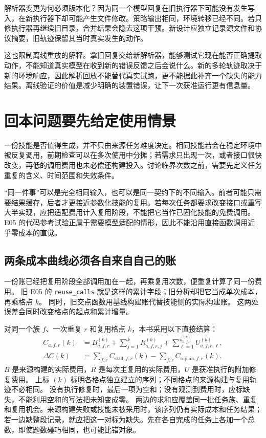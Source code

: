 解析器变更为何必须版本化？因为同一个模型回复在旧执行器下可能没有发生写入，在新执行器下却可能产生文件修改。策略输出相同，环境转移已经不同。若只修执行器再继续旧目录，合并结果会隐去这项干预。新设计应独立记录源文件和协议摘要，旧轨迹保留其当时真实发生的动作。

这也限制离线重放的解释。拿旧回复交给新解析器，能够测试它现在能否正确提取动作，不能知道真实模型在收到新的错误反馈之后会说什么。新的多轮轨迹取决于新的环境响应，因此解析回放不能替代真实试跑，更不能据此补齐一个缺失的能力结果。离线验证的价值是减少明确的装置错误，让下一次获准运行更有信息量。

\section{回本问题要先给定使用情景}
\label{sec:ch08-economics}

一份技能是否值得生成，并不只由来源任务难度决定。相同技能若会在稳定环境中被反复调用，前期检查可以在多次使用中分摊；若需求只出现一次，或者接口很快改变，再低的调用费用也未必偿还构建投入。讨论临界次数之前，需要先定义任务重复的含义、时间范围和失效条件。

“同一件事”可以是完全相同输入，也可以是同一契约下的不同输入。前者可能只需要结果缓存，后者才更接近参数化技能的复用。若每次任务都要求改变接口或重写大半实现，应把适配费用计入复用阶段，不能把它当作已固化技能的免费调用。E05 的代码参考试验正属于需要模型适配的情形，因此不能沿用直接函数调用近乎零成本的直觉。

\subsection{两条成本曲线必须各自来自自己的账}
\label{sec:ch08-ledger-reconcile}

一份账已经把复用阶段全部调用加在一起，再乘复用次数，便重复计算了同一份费用。
旧 E05 的 \texttt{reuse\_calls} 就是这样的累计字段；旧分析却把它当成单次成本，再乘格点 $k$。
同时，旧交点函数用基线构建账代替技能侧的实际构建账。
这两处误差会同时改变格点的起点和累计增量。

对同一个族 $f$、一次重复 $r$ 和复用格点 $k$，本书采用以下直接结算：
\begin{align}
 C_{a,f,r}(k)
 &= B_{a,f,r}^{(k)}+\sum_{j=1}^{k}R_{a,f,r,j}^{(k)}
    +\sum_{\ell=1}^{u_{a,f,r}^{(k)}}U_{a,f,r,\ell}^{(k)},
 \label{eq:ch08-observed-cost}\\
 \Delta C(k)
 &= \sum_{f,r}C_{\mathrm{skill},f,r}(k)
    -\sum_{f,r}C_{\mathrm{replan},f,r}(k).
\end{align}
$B$ 是来源构建的实际费用，$R$ 是每次主复用的实际费用，$U$ 是获准执行的附加修复费用。
上标 $(k)$ 标明各格点独立建立的序列；不同格点的来源构建与复用轨迹不必相同。
没有执行修复时，最后一项为空和；没有观测到费用时，应标缺失，不能利用空和的写法把未知变成零。
两边的求和应覆盖同一批任务族、重复和复用机会。来源构建失败或技能未被采用时，该序列仍有实际成本和任务结果；若一边缺整段记录，就应把这一对标为缺失。先在各自完成的任务上各加一个总数，即使题数碰巧相同，也可能比错对象。

